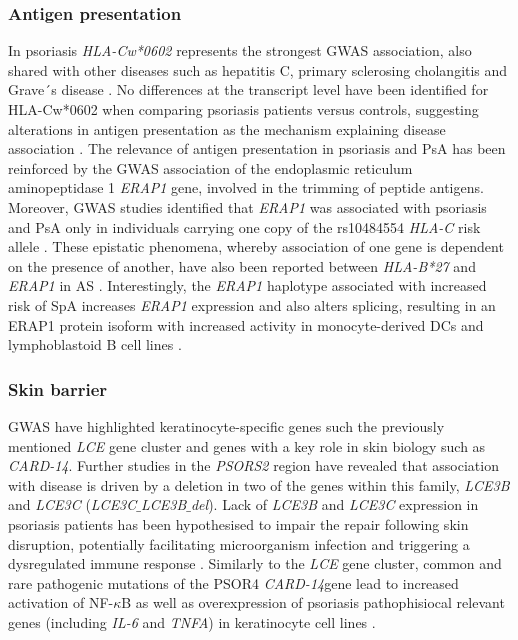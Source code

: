 \subsubsection*{Antigen presentation}
In psoriasis \textit{HLA-Cw*0602} represents the strongest GWAS association, also shared with other diseases such as hepatitis C, primary sclerosing cholangitis and Grave´s disease \parencite{Blais2011}. No differences at the transcript level have been identified for HLA-Cw*0602 when comparing psoriasis patients versus controls, suggesting alterations in antigen presentation as the mechanism explaining disease association \parencite{Hundhausen2012}. The relevance of antigen presentation in psoriasis and PsA has been reinforced by the GWAS association of the endoplasmic reticulum aminopeptidase 1 \textit{ERAP1} gene, involved in the trimming of peptide antigens. Moreover, GWAS studies identified that \textit{ERAP1} was associated with psoriasis and PsA only in individuals carrying one copy of the rs10484554 \textit{HLA-C} risk allele \parencite{Strange2010}. %
These epistatic phenomena, whereby association of one gene is dependent on the presence of another, have also been reported between \textit{HLA-B*27} and \textit{ERAP1} in AS \parencite{Evans2011, Cortes2015b}. Interestingly, the \textit{ERAP1} haplotype associated with increased risk of SpA increases \textit{ERAP1} expression and also alters splicing, resulting in an ERAP1 protein isoform with increased activity in monocyte-derived DCs and lymphoblastoid B cell lines \parencite{Constatino2015, Hanson2018}.%


\subsubsection*{Skin barrier}

\textcolor[rgb]{1,0,0}{GWAS have highlighted keratinocyte-specific genes such the previously mentioned \textit{LCE} gene cluster and genes with a key role in skin biology such as \textit{CARD-14}. Further studies in the \textit{PSORS2} region have revealed that association with disease is driven by a deletion in two of the genes within this family, \textit{LCE3B} and \textit{LCE3C} (\textit{LCE3C$\_ $LCE3B$\_ $del})\parencite{Cid2009}. Lack of \textit{LCE3B} and \textit{LCE3C} expression in psoriasis patients has been hypothesised to impair the repair following skin disruption, potentially facilitating microorganism infection and triggering a dysregulated immune response \parencite{Bergboer2011}. Similarly to the \textit{LCE} gene cluster, common and rare pathogenic mutations of the PSOR4 \textit{CARD-14}gene lead to increased activation of NF-$\kappa$B as well as overexpression of psoriasis pathophisiocal relevant genes (including \textit{IL-6} and \textit{TNFA}) in keratinocyte cell lines \parencite{Jordan2012}.}




